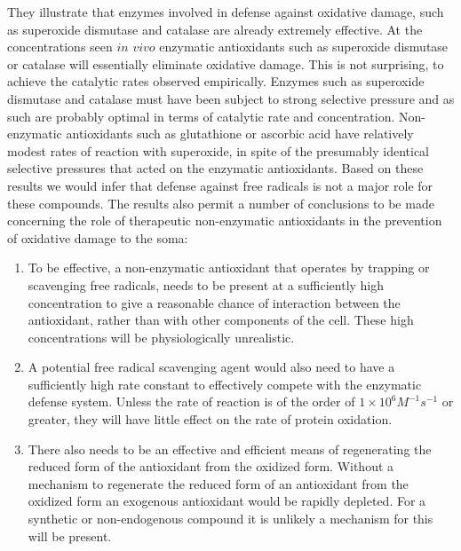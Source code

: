 \documentclass[preprint,12pt,authoryear]{elsarticle}
\begin{document}
They illustrate that enzymes involved in defense against oxidative damage,
such as superoxide dismutase and catalase  are already extremely effective. At the
concentrations seen $in$ $vivo$ enzymatic antioxidants such as superoxide dismutase or catalase will essentially eliminate oxidative damage. This is not
surprising, to achieve the catalytic rates observed empirically. Enzymes such as superoxide dismutase and catalase must have been subject to
strong selective pressure and as such are probably optimal in terms of catalytic rate and concentration. Non-enzymatic antioxidants such as glutathione or ascorbic acid have relatively modest rates of reaction with superoxide, in spite of the presumably identical
selective pressures that acted on the enzymatic antioxidants. Based on these results we would infer that defense against free radicals is
not a major role for these compounds.
The results also permit a number of conclusions to be made concerning the role of
therapeutic non-enzymatic antioxidants in the prevention of
oxidative damage to the soma:
\begin{enumerate}
\item
To be effective, a non-enzymatic antioxidant that operates by
trapping or scavenging free radicals, needs to be present at 
a sufficiently high concentration to give a reasonable chance 
of interaction between the antioxidant,
rather than with other components of the cell.
These high concentrations will be physiologically unrealistic.
\item
A potential free radical scavenging agent would also need to have a 
sufficiently high rate constant to effectively compete with the 
enzymatic defense system. Unless the rate of reaction is of the order of
$1 \times 10^6 M^{-1} s^{-1}$ or greater, they will have little 
effect on the rate of protein oxidation.
\item
There also needs to be an effective and efficient means of regenerating the
reduced form of the antioxidant from the oxidized form. Without a mechanism to
regenerate the reduced form of an antioxidant from the oxidized form an
exogenous antioxidant would be rapidly depleted. For a synthetic or 
non-endogenous compound it is unlikely a mechanism for this will be present.
\end{enumerate}
\end{document}

